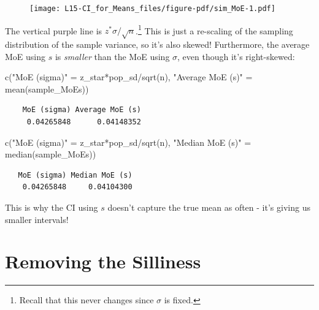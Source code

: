 \documentclass[
  letterpaper,
  DIV=11,
  numbers=noendperiod,
  oneside]{scrreprt}
\newenvironment{Shaded}{\begin{snugshade}}{\end{snugshade}}
\newcommand{\FunctionTok}[1]{\textcolor[rgb]{0.28,0.35,0.67}{#1}}
\newcommand{\NormalTok}[1]{\textcolor[rgb]{0.00,0.23,0.31}{#1}}
\newcommand{\OtherTok}[1]{\textcolor[rgb]{0.00,0.23,0.31}{#1}}
\newcommand{\SpecialCharTok}[1]{\textcolor[rgb]{0.37,0.37,0.37}{#1}}
\newcommand{\StringTok}[1]{\textcolor[rgb]{0.13,0.47,0.30}{#1}}
\begin{document}
\begin{figure}[H]

{\centering \texttt{[image: L15-CI\_for\_Means\_files/figure-pdf/sim\_MoE-1.pdf]}

}

\end{figure}

The vertical purple line is \(z^*\sigma/\sqrt n\).\footnote{Recall that
  this never changes since \(\sigma\) is fixed.} This is just a
re-scaling of the sampling distribution of the sample variance, so it's
also skewed! Furthermore, the average MoE using \(s\) is \emph{smaller}
than the MoE using \(\sigma\), even though it's right-skewed:

\begin{Shaded}
\begin{Highlighting}[]
\FunctionTok{c}\NormalTok{(}\StringTok{"MoE (sigma)"} \OtherTok{=}\NormalTok{ z\_star}\SpecialCharTok{*}\NormalTok{pop\_sd}\SpecialCharTok{/}\FunctionTok{sqrt}\NormalTok{(n),}
    \StringTok{"Average MoE (s)"} \OtherTok{=} \FunctionTok{mean}\NormalTok{(sample\_MoEs))}
\end{Highlighting}
\end{Shaded}

\begin{verbatim}
    MoE (sigma) Average MoE (s) 
     0.04265848      0.04148352 
\end{verbatim}

\begin{Shaded}
\begin{Highlighting}[]
\FunctionTok{c}\NormalTok{(}\StringTok{"MoE (sigma)"} \OtherTok{=}\NormalTok{ z\_star}\SpecialCharTok{*}\NormalTok{pop\_sd}\SpecialCharTok{/}\FunctionTok{sqrt}\NormalTok{(n),}
    \StringTok{"Median MoE (s)"} \OtherTok{=} \FunctionTok{median}\NormalTok{(sample\_MoEs))}
\end{Highlighting}
\end{Shaded}

\begin{verbatim}
   MoE (sigma) Median MoE (s) 
    0.04265848     0.04104300 
\end{verbatim}

This is why the CI using \(s\) doesn't capture the true mean as often -
it's giving us smaller intervals!

\hypertarget{removing-the-silliness}{%
\section{Removing the Silliness}\label{removing-the-silliness}}
\end{document}
